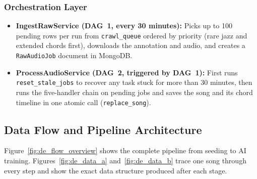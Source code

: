 \documentclass[a4paper]{article}
\begin{document}
\subsubsection{Orchestration Layer}

\begin{itemize}
    \item \textbf{IngestRawService (DAG~1, every 30 minutes):} Picks up to 100 pending rows per run from \texttt{crawl\_queue} ordered by priority (rare jazz and extended chords first), downloads the annotation and audio, and creates a \texttt{RawAudioJob} document in MongoDB.
    \item \textbf{ProcessAudioService (DAG~2, triggered by DAG~1):} First runs \texttt{reset\_stale\_jobs} to recover any task stuck for more than 30 minutes, then runs the five-handler chain on pending jobs and saves the song and its chord timeline in one atomic call (\texttt{replace\_song}).
\end{itemize}

\subsection{Data Flow and Pipeline Architecture}

Figure~\ref{fig:de_flow_overview} shows the complete pipeline from seeding to AI training. Figures~\ref{fig:de_data_a} and~\ref{fig:de_data_b} trace one song through every step and show the exact data structure produced after each stage.
\end{document}
